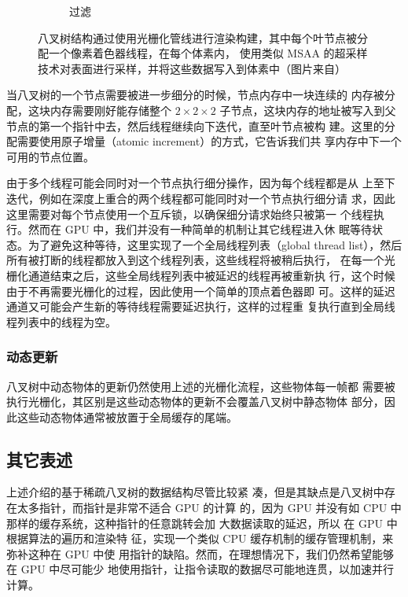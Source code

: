 \begin{figure}
\begin{fullwidth}
\begin{subfigure}[b]{0.2425\thewidth}
		\caption{过滤}
	\end{subfigure}
	\caption{八叉树结构通过使用光栅化管线进行渲染构建，其中每个叶节点被分配一个像素着色器线程，在每个体素内， 使用类似 MSAA 的超采样技术对表面进行采样，并将这些数据写入到体素中（图片来自\cite{a:Practicalreal-timevoxelbasedglobalilluminationforcurrentgpus}）}
	\label{f:vct-voxel-1}
\end{fullwidth}
\end{figure}

当八叉树的一个节点需要被进一步细分的时候，节点内存中一块连续的 内存被分配，这块内存需要刚好能存储整个 $2\times 2\times 2$ 子节点，这块内存的地址被写入到父节点的第一个指针中去，然后线程继续向下迭代，直至叶节点被构 建。这里的分配需要使用原子增量（atomic increment）的方式，它告诉我们共 享内存中下一个可用的节点位置。

由于多个线程可能会同时对一个节点执行细分操作，因为每个线程都是从 上至下迭代，例如在深度上重合的两个线程都可能同时对一个节点执行细分请 求，因此这里需要对每个节点使用一个互斥锁，以确保细分请求始终只被第一 个线程执行。然而在 GPU 中，我们并没有一种简单的机制让其它线程进入休 眠等待状态。为了避免这种等待，这里实现了一个全局线程列表（global thread list），然后所有被打断的线程都放入到这个线程列表，这些线程将被稍后执行， 在每一个光栅化通道结束之后，这些全局线程列表中被延迟的线程再被重新执 行，这个时候由于不再需要光栅化的过程，因此使用一个简单的顶点着色器即 可。这样的延迟通道又可能会产生新的等待线程需要延迟执行，这样的过程重 复执行直到全局线程列表中的线程为空。



\subsubsection{动态更新}
八叉树中动态物体的更新仍然使用上述的光栅化流程，这些物体每一帧都 需要被执行光栅化，其区别是这些动态物体的更新不会覆盖八叉树中静态物体 部分，因此这些动态物体通常被放置于全局缓存的尾端。



\subsection{其它表述}
上述介绍的基于稀疏八叉树的数据结构\cite{a:InteractiveIndirectIlluminationUsingVoxelConeTracing}尽管比较紧 凑，但是其缺点是八叉树中存在太多指针，而指针是非常不适合 GPU 的计算 的，因为 GPU 并没有如 CPU 中那样的缓存系统，这种指针的任意跳转会加 大数据读取的延迟，所以 \cite{a:Gigavoxels:Avoxelbasedrenderingpipelineforefficientexplorationoflargeanddetailedscenes} 在 GPU 中根据算法的遍历和渲染特 征，实现一个类似 CPU 缓存机制的缓存管理机制，来弥补这种在 GPU 中使 用指针的缺陷。然而，在理想情况下，我们仍然希望能够在 GPU 中尽可能少 地使用指针，让指令读取的数据尽可能地连贯，以加速并行计算。

